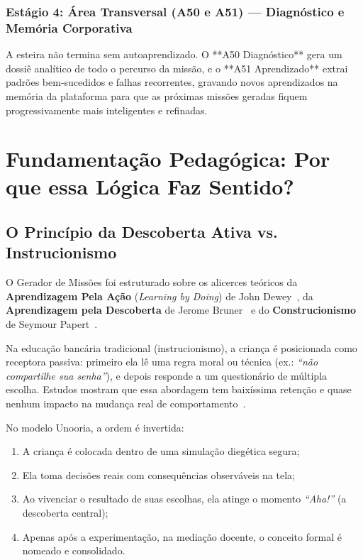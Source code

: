 \documentclass[11pt,a4paper]{article}
\begin{document}
\subsubsection{Estágio 4: Área Transversal (A50 e A51) --- Diagnóstico e Memória Corporativa}
A esteira não termina sem autoaprendizado. O **A50 Diagnóstico** gera um dossiê analítico de todo o percurso da missão, e o **A51 Aprendizado** extrai padrões bem-sucedidos e falhas recorrentes, gravando novos aprendizados na memória da plataforma para que as próximas missões geradas fiquem progressivamente mais inteligentes e refinadas.

\section{Fundamentação Pedagógica: Por que essa Lógica Faz Sentido?}
\label{sec:pedagogia}

\subsection{O Princípio da Descoberta Ativa vs. Instrucionismo}
O Gerador de Missões foi estruturado sobre os alicerces teóricos da \textbf{Aprendizagem Pela Ação} (\textit{Learning by Doing}) de John Dewey~\cite{dewey1938experience}, da \textbf{Aprendizagem pela Descoberta} de Jerome Bruner~\cite{bruner1961discovery} e do \textbf{Construcionismo} de Seymour Papert~\cite{papert1980mindstorms}.

Na educação bancária tradicional (instrucionismo), a criança é posicionada como receptora passiva: primeiro ela lê uma regra moral ou técnica (ex.: \textit{``não compartilhe sua senha''}), e depois responde a um questionário de múltipla escolha. Estudos mostram que essa abordagem tem baixíssima retenção e quase nenhum impacto na mudança real de comportamento~\cite{merrill2002first}.

No modelo Unooria, a ordem é invertida:
\begin{enumerate}
  \item A criança é colocada dentro de uma simulação diegética segura;
  \item Ela toma decisões reais com consequências observáveis na tela;
  \item Ao vivenciar o resultado de suas escolhas, ela atinge o momento \textit{``Aha!''} (a descoberta central);
  \item Apenas após a experimentação, na mediação docente, o conceito formal é nomeado e consolidado.
\end{enumerate}
\end{document}
